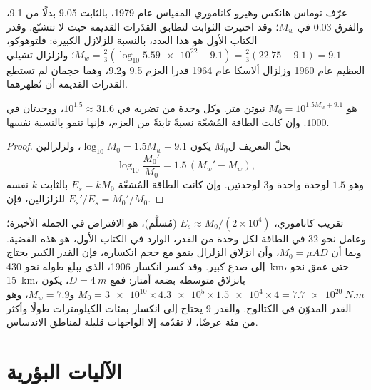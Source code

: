 عرّف توماس هانكس وهيرو كاناموري المقياس عام 1979، بالثابت 9.05 بدلًا من 9.1، والفرق 0.03 في $M_w$؛ وقد اختيرت الثوابت لتطابق القدَرات القديمة حيث لا تتشبّع. وقدر الكتاب الأول هو هذا العدد، بالنسبة للزلازل الكبيرة: فلتوهوكو،
$M_w = \tfrac23(\log_{10}\num{5.59e22} - 9.1) = \tfrac23(22.75 - 9.1) = 9.1$؛ ولزلزال تشيلي العظيم عام 1960 وزلزال ألاسكا عام 1964 قدرا العزم 9.5 و\num{9.2}، وهما حجمان لم تستطع القدرات القديمة أن تُظهرهما.

\begin{proposition}\label{prop:b1:earthquake-source:moment-steps}
 هو $M_0 = 10^{1.5 M_w + 9.1}$ نيوتن متر. وكل وحدة من  تضربه في $10^{1.5} \approx 31.6$، ووحدتان في $1000$. وإن كانت الطاقة المُشعّة نسبةً ثابتةً من العزم، فإنها تنمو بالنسبة نفسها.
\end{proposition}

\begin{proof}
بحلّ التعريف ل$M_0$ يكون $\log_{10} M_0 = 1.5 M_w + 9.1$، ولزلزالين
\[
  \log_{10}\frac{M_0'}{M_0} = 1.5\,(M_w' - M_w) ,
\]
وهو $1.5$ لوحدة واحدة و$3$ لوحدتين. وإن كانت الطاقة المُشعّة $E_s = k M_0$ بالثابت $k$ نفسه للزلزالين، فإن $E_s'/E_s = M_0'/M_0$.
\end{proof}

تقريب كاناموري، $E_s \approx M_0/(2\times10^4)$ (مُسلَّم)، هو الافتراض في الجملة الأخيرة؛ وعامل نحو 32 في الطاقة لكل وحدة من القدر، الوارد في الكتاب الأول، هو هذه القضية. وبما أن $M_0 = \mu A D$، وأن انزلاق الزلزال ينمو مع حجم انكساره، فإن القدر الكبير يحتاج إلى صدع كبير. وقد كسر انكسار 1906، الذي يبلغ طوله نحو \qty{430}{km}،  حتى عمق نحو \qty{15}{km}، بانزلاق متوسطه بضعة أمتار: فمع $D = \qty{4}{m}$، يكون $M_0 = \num{3e10}\times\num{4.3e5}\times\num{1.5e4}
\times 4 = \qty{7.7e20}{N.m}$ و$M_w = 7.9$، وهو القدر المدوّن في الكتالوج. والقدر 9 يحتاج إلى انكسار بمئات الكيلومترات طولًا وأكثر من مئة عرضًا، لا تقدّمه إلا الواجهات قليلة  لمناطق الاندساس.

\section{الآليات البؤرية}\label{sec:b1:earthquake-source:focal}

